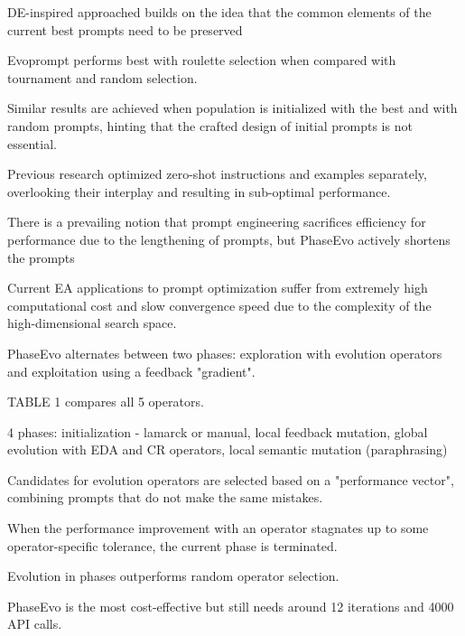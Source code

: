 DE-inspired approached builds on the idea that the common elements of the current best prompts need to be preserved \cite{guo2024connectinglargelanguagemodels}

Evoprompt performs best with roulette selection when compared with tournament and random selection. \cite{guo2024connectinglargelanguagemodels}

Similar results are achieved when population is initialized with the best and with random prompts, hinting that the crafted design of initial prompts is not essential. \cite{guo2024connectinglargelanguagemodels}


Previous research optimized zero-shot instructions and examples separately, overlooking their interplay and resulting in sub-optimal performance. \cite{cui2024phaseevounifiedincontextprompt}

There is a prevailing notion that prompt engineering sacrifices efficiency for performance due to the lengthening of prompts, but PhaseEvo actively shortens the prompts \cite{cui2024phaseevounifiedincontextprompt}

Current EA applications to prompt optimization suffer from extremely high computational cost and slow convergence speed due to the complexity of the high-dimensional search space. \cite{cui2024phaseevounifiedincontextprompt}

PhaseEvo alternates between two phases: exploration with evolution operators and exploitation using a feedback "gradient". \cite{cui2024phaseevounifiedincontextprompt}

TABLE 1  compares all 5 operators.  \cite{cui2024phaseevounifiedincontextprompt}

4 phases: initialization - lamarck or manual, local feedback mutation, global evolution with EDA and CR operators, local semantic mutation (paraphrasing) \cite{cui2024phaseevounifiedincontextprompt}

Candidates for evolution operators are selected based on a "performance vector", combining prompts that do not make the same mistakes.  \cite{cui2024phaseevounifiedincontextprompt}

When the performance improvement with an operator stagnates up to some operator-specific tolerance, the current phase is terminated. \cite{cui2024phaseevounifiedincontextprompt}

Evolution in phases outperforms random operator selection. \cite{cui2024phaseevounifiedincontextprompt}

PhaseEvo is the most cost-effective but still needs around 12 iterations and 4000 API calls. \cite{cui2024phaseevounifiedincontextprompt}


